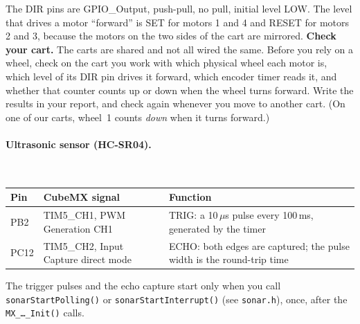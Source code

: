 \documentclass[11pt,a4paper]{article}
\begin{document}
\smallskip\noindent
The DIR pins are GPIO\_Output, push-pull, no pull, initial level LOW. The level that drives a motor ``forward'' is SET
for motors 1 and 4 and RESET for motors 2 and 3, because the motors on the two sides of the cart are mirrored.
\textbf{Check your cart.} The carts are shared and not all wired the same. Before you rely on a wheel, check on the
cart you work with which physical wheel each motor is, which level of its DIR pin drives it forward, which encoder
timer reads it, and whether that counter counts up or down when the wheel turns forward. Write the results in your
report, and check again whenever you move to another cart. (On one of our carts, wheel~1 counts \emph{down} when it
turns forward.)

\paragraph{Ultrasonic sensor (HC-SR04).}\leavevmode\\[2pt]
\begin{tabularx}{\textwidth}{@{}l l L@{}}
\toprule
Pin & CubeMX signal & Function \\
\midrule
PB2 & TIM5\_CH1, PWM Generation CH1 & TRIG: a 10\,$\mu$s pulse every 100\,ms, generated by the timer \\
PC12 & TIM5\_CH2, Input Capture direct mode & ECHO: both edges are captured; the pulse width is the round-trip time \\
\bottomrule
\end{tabularx}

\smallskip\noindent
The trigger pulses and the echo capture start only when you call \texttt{sonarStartPolling()} or
\texttt{sonarStartInterrupt()} (see \texttt{sonar.h}), once, after the \texttt{MX\_\ldots\_Init()} calls.
\end{document}
